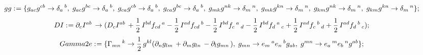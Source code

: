 \documentclass[11pt]{article}
\def\specialcolon{\mathrel{\mathop{:}}\hspace{-.5em}}
\begin{document}
\begin{dmath*}[compact, spread=2pt]
gg\specialcolon{}= \{{g}_{a c} {g}^{c b} \rightarrow {\delta}_{a}\,^{b},\; {g}_{a c} {g}^{b c} \rightarrow {\delta}_{a}\,^{b},\; {g}_{c a} {g}^{c b} \rightarrow {\delta}_{a}\,^{b},\; {g}_{c a} {g}^{b c} \rightarrow {\delta}_{a}\,^{b},\; {g}_{m k} {g}^{n k} \rightarrow {\delta}_{m}\,^{n},\; {g}_{m k} {g}^{k n} \rightarrow {\delta}_{m}\,^{n},\; {g}_{k m} {g}^{n k} \rightarrow {\delta}_{m}\,^{n},\; {g}_{k m} {g}^{k n} \rightarrow {\delta}_{m}\,^{n}\};
\end{dmath*}
\begin{dmath*}[compact, spread=2pt]
DI\specialcolon{}= {\partial}_{c}{{I}^{a b}}\,  \rightarrow ({D}_{c}{{I}^{a b}}\,  + \frac{1}{2}\, {I}^{b d} {f}_{c d}\,^{a} - \frac{1}{2}\, {I}^{a d} {f}_{c d}\,^{b} - \frac{1}{2}\, {I}^{b d} {f}_{c}\,^{a}\,_{d} - \frac{1}{2}\, {I}^{b d} {f}_{d}\,^{a}\,_{c} + \frac{1}{2}\, {I}^{a d} {f}_{c}\,^{b}\,_{d} + \frac{1}{2}\, {I}^{a d} {f}_{d}\,^{b}\,_{c});
\end{dmath*}
\begin{dmath*}[compact, spread=2pt]
Gamma2e\specialcolon{}= \{{\Gamma}_{m n}\,^{k} \rightarrow \frac{1}{2}\, {g}^{k l} ({\partial}_{n}{{g}_{l m}}\,  + {\partial}_{m}{{g}_{l n}}\,  - {\partial}_{l}{{g}_{m n}}\, ),\; {g}_{m n} \rightarrow {e}_{m}\,^{a} {e}_{n}\,^{b} {g}_{a b},\; {g}^{m n} \rightarrow {e}_{a}\,^{m} {e}_{b}\,^{n} {g}^{a b}\};
\end{dmath*}
\end{document}
